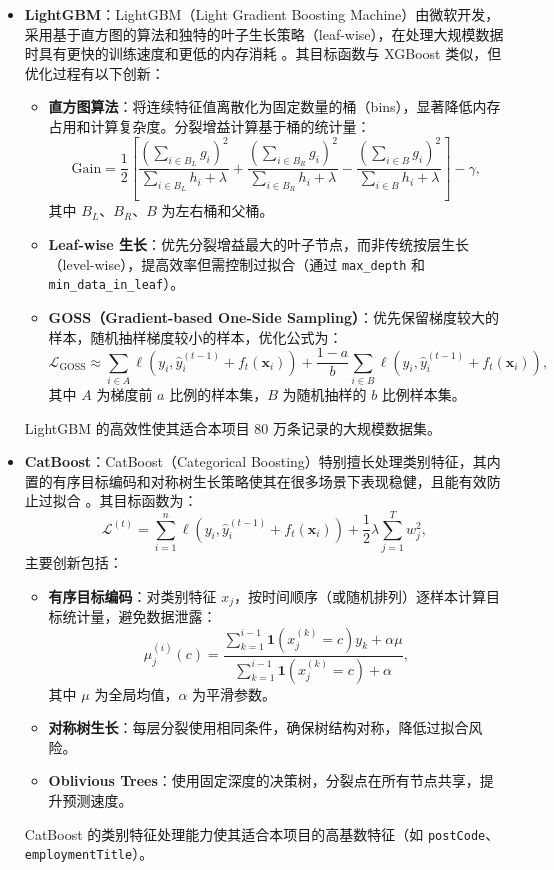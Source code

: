 \documentclass{thuemp}
\begin{document}
\begin{itemize}
    \item \textbf{LightGBM}：LightGBM（Light Gradient Boosting Machine）由微软开发，采用基于直方图的算法和独特的叶子生长策略（leaf-wise），在处理大规模数据时具有更快的训练速度和更低的内存消耗 \citep{ke2017lightgbm}。其目标函数与 XGBoost 类似，但优化过程有以下创新：
    \begin{itemize}
        \item \textbf{直方图算法}：将连续特征值离散化为固定数量的桶（bins），显著降低内存占用和计算复杂度。分裂增益计算基于桶的统计量：
        \[
        \text{Gain} = \frac{1}{2} \left[ \frac{(\sum_{i \in B_L} g_i)^2}{\sum_{i \in B_L} h_i + \lambda} + \frac{(\sum_{i \in B_R} g_i)^2}{\sum_{i \in B_R} h_i + \lambda} - \frac{(\sum_{i \in B} g_i)^2}{\sum_{i \in B} h_i + \lambda} \right] - \gamma,
        \]
        其中 $B_L$、$B_R$、$B$ 为左右桶和父桶。
        \item \textbf{Leaf-wise 生长}：优先分裂增益最大的叶子节点，而非传统按层生长（level-wise），提高效率但需控制过拟合（通过 \texttt{max\_depth} 和 \texttt{min\_data\_in\_leaf}）。
        \item \textbf{GOSS（Gradient-based One-Side Sampling）}：优先保留梯度较大的样本，随机抽样梯度较小的样本，优化公式为：
        \[
        \mathcal{L}_{\text{GOSS}} \approx \sum_{i \in A} \ell(y_i, \hat{y}_i^{(t-1)} + f_t(\mathbf{x}_i)) + \frac{1-a}{b} \sum_{i \in B} \ell(y_i, \hat{y}_i^{(t-1)} + f_t(\mathbf{x}_i)),
        \]
        其中 $A$ 为梯度前 $a$ 比例的样本集，$B$ 为随机抽样的 $b$ 比例样本集。
    \end{itemize}
    LightGBM 的高效性使其适合本项目 80 万条记录的大规模数据集。

    \item \textbf{CatBoost}：CatBoost（Categorical Boosting）特别擅长处理类别特征，其内置的有序目标编码和对称树生长策略使其在很多场景下表现稳健，且能有效防止过拟合 \citep{prokhorenkova2018catboost}。其目标函数为：
    \[
    \mathcal{L}^{(t)} = \sum_{i=1}^n \ell(y_i, \hat{y}_i^{(t-1)} + f_t(\mathbf{x}_i)) + \frac{1}{2} \lambda \sum_{j=1}^T w_j^2,
    \]
    主要创新包括：
    \begin{itemize}
        \item \textbf{有序目标编码}：对类别特征 $x_j$，按时间顺序（或随机排列）逐样本计算目标统计量，避免数据泄露：
        \[
        \mu_j^{(i)}(c) = \frac{\sum_{k=1}^{i-1} \mathbf{1}(x_j^{(k)} = c) y_k + \alpha \mu}{\sum_{k=1}^{i-1} \mathbf{1}(x_j^{(k)} = c) + \alpha},
        \]
        其中 $\mu$ 为全局均值，$\alpha$ 为平滑参数。
        \item \textbf{对称树生长}：每层分裂使用相同条件，确保树结构对称，降低过拟合风险。
        \item \textbf{Oblivious Trees}：使用固定深度的决策树，分裂点在所有节点共享，提升预测速度。
    \end{itemize}
    CatBoost 的类别特征处理能力使其适合本项目的高基数特征（如 \texttt{postCode}、\texttt{employmentTitle}）。
\end{itemize}
\end{document}
